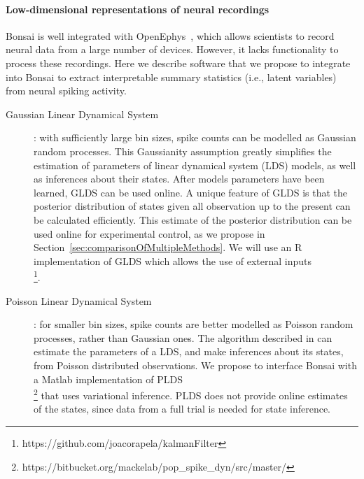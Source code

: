 \paragraph{Low-dimensional representations of neural recordings}
\label{sec:lowDimensionalRepresentation}

Bonsai is well integrated with OpenEphys~\citep{siegleEtAl17}, which allows
scientists to record neural data from a large number of devices. However, it
lacks functionality to process these recordings. Here we describe software that
we propose to integrate into Bonsai to extract interpretable summary statistics
(i.e., latent variables) from neural spiking activity.

\begin{description}

    \item[Gaussian Linear Dynamical
        System]\citep[GLDS][]{andersonAndMoore12}: with sufficiently large
        bin sizes, spike counts can be modelled as Gaussian random processes.
        This Gaussianity assumption greatly simplifies the estimation of
        parameters of linear dynamical system (LDS) models, as well as
        inferences about their states. After models parameters have been
        learned, GLDS can be used online. A unique feature of GLDS is that the
        posterior distribution of states given all observation up to the
        present can be calculated efficiently. This estimate of the posterior
        distribution can be used online for experimental control, as we
        propose in Section~\ref{sec:comparisonOfMultipleMethods}. We will use an R implementation of GLDS
        which allows the use of external
        inputs\\ \footnote{https://github.com/joacorapela/kalmanFilter}.

    \item[Poisson Linear Dynamical System]\citep[PLDS][]{mackeEtAl15}: for
        smaller bin sizes, spike counts are better modelled as Poisson random
        processes, rather than Gaussian ones. The algorithm described in
        \citet{mackeEtAl15} can estimate the parameters of a LDS, and make
        inferences about its states, from Poisson distributed observations.  We
        propose to interface Bonsai with a Matlab implementation of
        PLDS\\ \footnote{https://bitbucket.org/mackelab/pop\_spike\_dyn/src/master/}
        that uses variational inference. PLDS does not provide online estimates
        of the states, since data from a full trial is needed for state
        inference.


\end{description}
